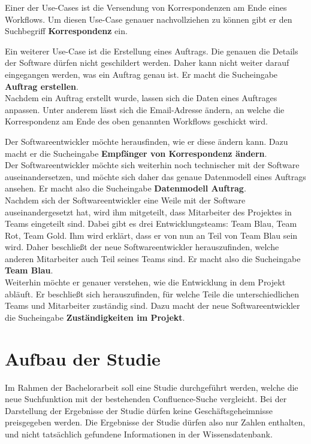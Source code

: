 Einer der Use-Cases ist die Versendung von Korrespondenzen am Ende eines Workflows.
Um diesen Use-Case genauer nachvollziehen zu können gibt er den Suchbegriff \textbf{Korrespondenz} ein.

Ein weiterer Use-Case ist die Erstellung eines Auftrags.
Die genauen die Details der Software dürfen nicht geschildert werden.
Daher kann nicht weiter darauf eingegangen werden, was ein Auftrag genau ist.
Er macht die Sucheingabe \textbf{Auftrag erstellen}.\\

Nachdem ein Auftrag erstellt wurde, lassen sich die Daten eines Auftrages anpassen.
Unter anderem lässt sich die Email-Adresse ändern, an welche die Korrespondenz am Ende des oben genannten Workflows geschickt wird.

Der Softwareentwickler möchte herausfinden, wie er diese ändern kann.
Dazu macht er die Sucheingabe \textbf{Empfänger von Korrespondenz ändern}.\\

Der Softwareentwickler möchte sich weiterhin noch technischer mit der Software auseinandersetzen, und möchte sich daher das genaue Datenmodell eines Auftrags ansehen.
Er macht also die Sucheingabe \textbf{Datenmodell Auftrag}.\\

Nachdem sich der Softwareentwickler eine Weile mit der Software auseinandergesetzt hat, wird ihm mitgeteilt, dass Mitarbeiter des Projektes in Teams eingeteilt sind.
Dabei gibt es drei Entwicklungsteams: Team Blau, Team Rot, Team Gold.
Ihm wird erklärt, dass er von nun an Teil von Team Blau sein wird.
Daher beschließt der neue Softwareentwickler herauszufinden, welche anderen Mitarbeiter auch Teil seines Teams sind.
Er macht also die Sucheingabe \textbf{Team Blau}.\\

Weiterhin möchte er genauer verstehen, wie die Entwicklung in dem Projekt abläuft.
Er beschließt sich herauszufinden, für welche Teile die unterschiedlichen Teams und Mitarbeiter zuständig sind.
Dazu macht der neue Softwareentwickler die Sucheingabe \textbf{Zuständigkeiten im Projekt}.

\section{Aufbau der Studie}
Im Rahmen der Bachelorarbeit soll eine Studie durchgeführt werden, welche die neue Suchfunktion mit der bestehenden Confluence-Suche vergleicht.
Bei der Darstellung der Ergebnisse der Studie dürfen keine Geschäftsgeheimnisse preisgegeben werden.
Die Ergebnisse der Studie dürfen also nur Zahlen enthalten, und nicht tatsächlich gefundene Informationen in der Wissensdatenbank.\\


